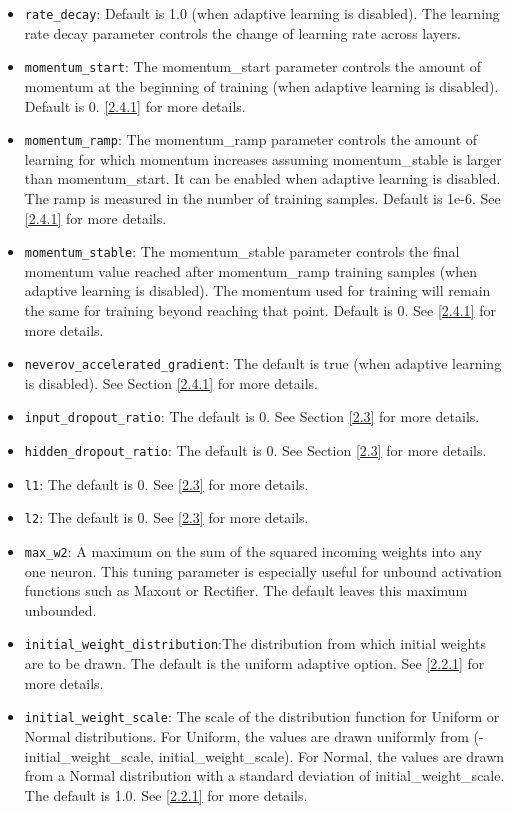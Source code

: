 \documentclass[11pt]{article}
\begin{document}
\begin{itemize}
\item \texttt{rate\_decay}: Default is 1.0 (when adaptive learning is disabled). The learning rate decay parameter controls the change of learning rate across layers.
\item \texttt{momentum\_start}: The momentum\_start parameter controls the amount of momentum at the beginning of training (when adaptive learning is disabled). Default is 0. \ref{2.4.1} for more details.
\item \texttt{momentum\_ramp}: The momentum\_ramp parameter controls the amount of learning for which momentum increases assuming momentum\_stable is larger than momentum\_start. It can be enabled when adaptive learning is disabled. The ramp is measured in the number of training samples. Default is 1e-6. See \ref{2.4.1} for more details.
\item \texttt{momentum\_stable}: The momentum\_stable parameter controls the final momentum value reached after momentum\_ramp training samples (when adaptive learning is disabled). The momentum used for training will remain the same for training beyond reaching that point. Default is 0.  See \ref{2.4.1} for more details.
\item \texttt{neverov\_accelerated\_gradient}: The default is true (when adaptive learning is disabled). See Section \ref{2.4.1} for more details.
\item \texttt{input\_dropout\_ratio}: The default is 0. See Section \ref{2.3} for more details.
\item \texttt{hidden\_dropout\_ratio}: The default is 0. See Section \ref{2.3} for more details.
\item \texttt{l1}: The default is 0. See \ref{2.3} for more details.
\item \texttt{l2}: The default is 0. See \ref{2.3} for more details.
\item \texttt{max\_w2}: A maximum on the sum of the squared incoming weights into any one neuron. This tuning parameter is especially useful for unbound activation functions such as Maxout or Rectifier. The default leaves this maximum unbounded.
\item \texttt{initial\_weight\_distribution}:The distribution from which initial weights are to be drawn. The default is the uniform adaptive option. See \ref{2.2.1} for more details.
\item \texttt{initial\_weight\_scale}: The scale of the distribution function for Uniform or Normal distributions. For Uniform, the values are drawn uniformly from (-initial\_weight\_scale, initial\_weight\_scale). For Normal, the values are drawn from a Normal distribution with a standard deviation of initial\_weight\_scale. The default is 1.0. See \ref{2.2.1} for more details.

\end{itemize}
\end{document}
